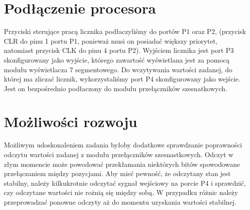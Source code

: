 \documentclass[fleqn]{article}
\begin{document}
\pagebreak



\pagebreak







\section{Podłączenie procesora}

Przyciski sterujące pracą licznika podłaczyliśmy do portów P1 oraz P2, (przycisk CLR do pinu 1 portu P1, ponieważ musi on posiadać większy priorytet, natomiast przycisk CLK do pinu 4 portu P2). Wyjściem licznika jest port P3 skonfigurowany jako wyjście, którego zawartość wyświetlana jest za pomocą modułu wyświetlacza 7 segmentowego. Do wczytywania wartości zadanej, do której ma zliczać licznik, wykorzystaliśmy port P4 skonfigurowany jako wejście. Jest on bezpośrednio podłaczony do modułu przełączników szesnatkowych.

\section{Możliwości rozwoju}

Możliwym udoskonaleniem zadania byłoby dodatkowe sprawdzanie poprawności odczytu wartości zadanej z modułu przełączników szesnastkowych. Odczyt w złym momencie może powodować przekłamania niektórych bitów spowodowane przełączaniem między pozycjami. Aby mieć pewność, że odczytany stan jest stabilny, należy kilkukrotnie odczytać sygnał wejściowy na porcie P4 i sprawdzić, czy odczytane wartości nie rożnią się między sobą. W przypadku różnic należy przeprowadzać ponowne odczyty aż do momentu uzyskania wartości stabilnej.
\end{document}
